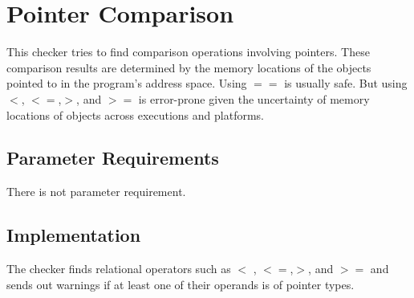 %
%

\section{Pointer Comparison}
\label{PointerComparison::overview}

This checker tries to find comparison operations involving
pointers. These comparison results are determined by the memory locations of
the objects pointed to in the program's address space. Using $==$ is usually
safe. But using $<$, $<=$,$>$, and $>=$ is error-prone given the
uncertainty of memory locations of objects across executions and platforms. 

\subsection{Parameter Requirements}

There is not parameter requirement.

\subsection{Implementation}

The checker finds relational operators such as $<$ , $<=$,$>$, and $>=$
and sends out warnings if at least one of their operands is of pointer types.

